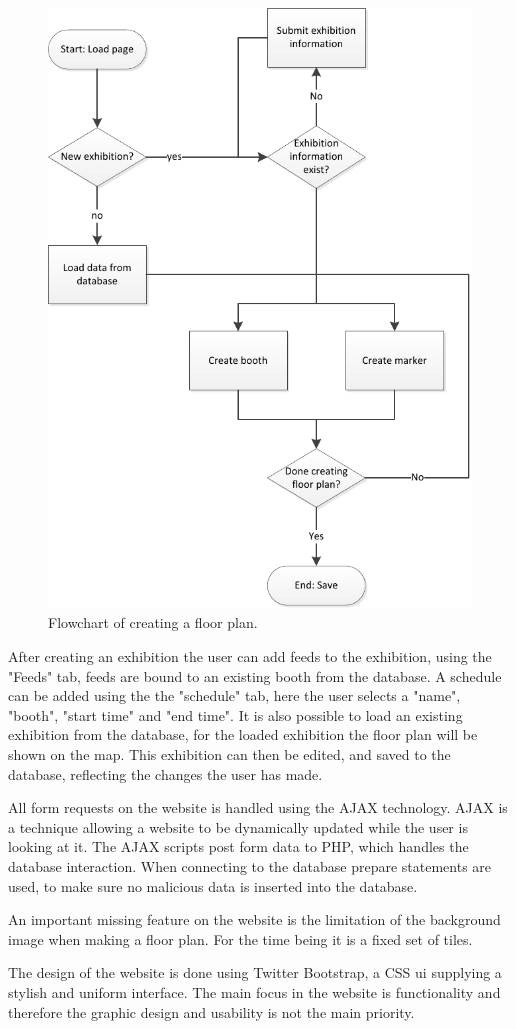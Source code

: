 \begin{figure}[H]
	\centering
	\includegraphics[width=0.7\linewidth]{img/floorplanflow.pdf}
	\caption{Flowchart of creating a floor plan.\label{fig:floorplan}}
\end{figure}

After creating an exhibition the user can add feeds to the exhibition, using the "Feeds" tab, feeds are bound to an existing booth from the database. A schedule can be added using the the "schedule" tab, here the user selects a "name", "booth", "start time" and "end time".
It is also possible to load an existing exhibition from the database, for the loaded exhibition the floor plan will be shown on the map. This exhibition can then be edited, and saved to the database, reflecting the changes the user has made.


All form requests on the website is handled using the AJAX technology\citep{ajax}. AJAX is a technique allowing a website to be dynamically updated while the user is looking at it.
The AJAX scripts post form data to PHP, which handles the database interaction. When connecting to the database prepare statements are used, to make sure no malicious data is inserted into the database.

An important missing feature on the website is the limitation of the background image when making a floor plan. For the time being it is a fixed set of tiles.

The design of the website is done using Twitter Bootstrap\citep{twitterbootstrap}, a CSS \ac{ui} supplying a stylish and uniform interface.
The main focus in the website is functionality and therefore the graphic design and usability is not the main priority.

